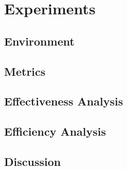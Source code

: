 \section{Experiments}
\subsection{Environment}
\subsection{Metrics}
\subsection{Effectiveness Analysis}
\subsection{Efficiency Analysis}
\subsection{Discussion}
